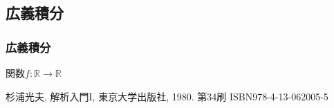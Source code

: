 \documentclass[dvipdfmx]{jsarticle}
\begin{document}
\subsection{広義積分}%
\subsubsection{広義積分}%
\begin{dfn} 関数$f:\mathbb{R} \rightarrow \mathbb{R}$
\end{dfn}
\begin{thebibliography}{50}
  杉浦光夫, 解析入門I, 東京大学出版社, 1980. 第34刷 ISBN978-4-13-062005-5
\end{thebibliography}
\end{document}
